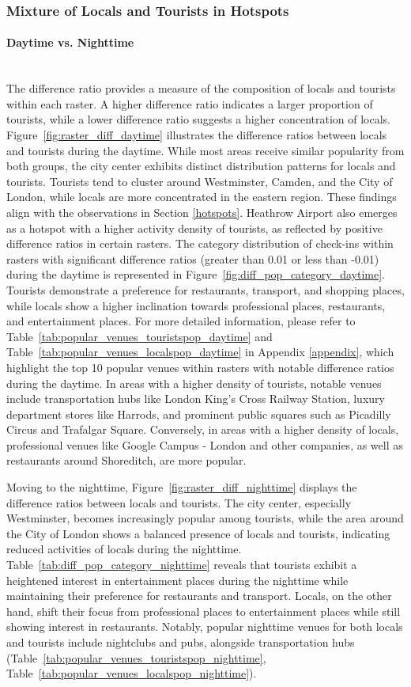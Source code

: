\documentclass{article}
\newcommand{\subsubsubsection}[1]{\paragraph{#1}\mbox{}\\}
\theoremstyle{definition}
\theoremstyle{remark}
\begin{document}
\subsubsection{Mixture of Locals and Tourists in Hotspots}

\subsubsubsection{Daytime vs. Nighttime}
The difference ratio provides a measure of the composition of locals and tourists within each raster. A higher difference ratio indicates a larger proportion of tourists, while a lower difference ratio suggests a higher concentration of locals. Figure~\ref{fig:raster_diff_daytime} illustrates the difference ratios between locals and tourists during the daytime. While most areas receive similar popularity from both groups, the city center exhibits distinct distribution patterns for locals and tourists. Tourists tend to cluster around Westminster, Camden, and the City of London, while locals are more concentrated in the eastern region. These findings align with the observations in Section \ref{hotspots}. Heathrow Airport also emerges as a hotspot with a higher activity density of tourists, as reflected by positive difference ratios in certain rasters. The category distribution of check-ins within rasters with significant difference ratios (greater than 0.01 or less than -0.01) during the daytime is represented in Figure~\ref{fig:diff_pop_category_daytime}. Tourists demonstrate a preference for restaurants, transport, and shopping places, while locals show a higher inclination towards professional places, restaurants, and entertainment places. For more detailed information, please refer to Table~\ref{tab:popular_venues_touristspop_daytime} and Table~\ref{tab:popular_venues_localspop_daytime} in Appendix \ref{appendix}, which highlight the top 10 popular venues within rasters with notable difference ratios during the daytime. In areas with a higher density of tourists, notable venues include transportation hubs like London King's Cross Railway Station, luxury department stores like Harrods, and prominent public squares such as Picadilly Circus and Trafalgar Square. Conversely, in areas with a higher density of locals, professional venues like Google Campus - London and other companies, as well as restaurants around Shoreditch, are more popular.

Moving to the nighttime, Figure~\ref{fig:raster_diff_nighttime} displays the difference ratios between locals and tourists. The city center, especially Westminster, becomes increasingly popular among tourists, while the area around the City of London shows a balanced presence of locals and tourists, indicating reduced activities of locals during the nighttime. Table~\ref{tab:diff_pop_category_nighttime} reveals that tourists exhibit a heightened interest in entertainment places during the nighttime while maintaining their preference for restaurants and transport. Locals, on the other hand, shift their focus from professional places to entertainment places while still showing interest in restaurants. Notably, popular nighttime venues for both locals and tourists include nightclubs and pubs, alongside transportation hubs (Table~\ref{tab:popular_venues_touristspop_nighttime}, Table~\ref{tab:popular_venues_localspop_nighttime}).
\end{document}

